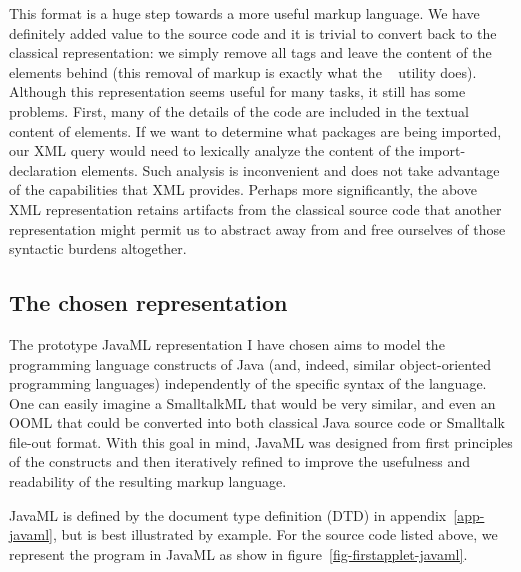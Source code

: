 \documentclass{article}
\begin{document}
This format is a huge step towards a more useful markup language.  We
have definitely added value to the source code and it is trivial to
convert back to the classical representation: we simply remove all tags
and leave the content of the elements behind (this removal of markup is
exactly what the ~\cite{perlSGML} utility does).
Although this representation seems useful for many tasks, it still has
some problems.  First, many of the details of the code are included in
the textual content of elements.  If we want to determine what packages
are being imported, our XML query would need to lexically analyze the
content of the import-declaration elements.  Such analysis is
inconvenient and does not take advantage of the capabilities that XML
provides.  Perhaps more significantly, the above XML representation
retains artifacts from the classical source code that another
representation might permit us to abstract away from and free ourselves
of those syntactic burdens altogether.

\subsection{The chosen representation}

The prototype JavaML representation I have chosen aims to model the
programming language constructs of Java (and, indeed, similar
object-oriented programming languages) independently of the specific
syntax of the language.  One can easily imagine a SmalltalkML that would
be very similar, and even an OOML that could be converted into both
classical Java source code or Smalltalk file-out format.  With this goal
in mind, JavaML was designed from first principles of the constructs and
then iteratively refined to improve the usefulness and readability of
the resulting markup language.

JavaML is defined by the document type definition (DTD) in
appendix~\ref{app-javaml}, but is best illustrated by example.  For the
 source code listed above, we represent the
program in JavaML as show in figure~\ref{fig-firstapplet-javaml}.
\end{document}
